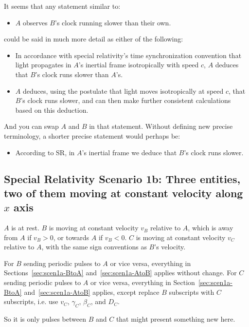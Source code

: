 \documentclass[a4paper]{article}
\theoremstyle{plain}
\theoremstyle{definition}
\begin{document}
It seems that any statement similar to:
\begin{itemize}
\item $A$ observes $B$'s clock running slower than their own.
\end{itemize}
could be said in much more detail as either of the following:
\begin{itemize}
\item In accordance with special relativity's time synchronization
  convention that light propagates in $A$'s inertial frame
  isotropically with speed $c$, $A$ deduces that $B$'s clock runs
  slower than $A$'s.
\item $A$ deduces, using the postulate that light moves isotropically
  at speed $c$, that $B$’s clock runs slower, and can then make
  further consistent calculations based on this deduction.
\end{itemize}
And you can swap $A$ and $B$ in that statement.  Without defining new
precise terminology, a shorter precise statement would perhaps be:
\begin{itemize}
\item According to SR, in $A$'s inertial frame we deduce that $B$'s
  clock runs slower.
\end{itemize}


\subsection{Special Relativity Scenario 1b: Three entities, two of them moving at constant velocity along $x$ axis}
\label{sec:scen1b}

$A$ is at rest.
$B$ is moving at constant velocity $v_B$ relative to $A$,
which is away from $A$ if $v_B > 0$, or towards $A$ if $v_B < 0$.
$C$ is moving at constant velocity $v_C$ relative to $A$,
with the same sign conventions as $B$'s velocity.

For $B$ sending periodic pulses to $A$ or vice versa, everything in
Sections~\ref{sec:scen1a-BtoA} and~\ref{sec:scen1a-AtoB} applies without
change.
For $C$ sending periodic pulses to $A$ or vice versa, everything in
Section~\ref{sec:scen1a-BtoA} and~\ref{sec:scen1a-AtoB} applies,
except replace $B$ subscripts
with $C$ subscripts, i.e. use $v_C$, $\gamma_C$, $\beta_C$, and $D_C$.

So it is only pulses between $B$ and $C$ that might present something
new here.
\end{document}
